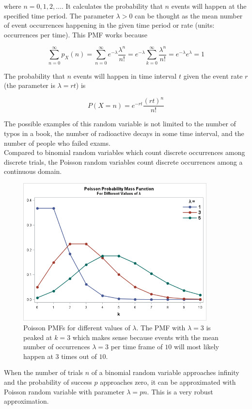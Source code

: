 where $n=0,1,2,\dots$. It calculates the probability that $n$ events will happen at the specified time period. The parameter $\lambda>0$ can be thought as the mean number of event occurrences happening in the given time period or rate (units: occurrences per time). This PMF works because

$$\sum_{n=0}^\infty p_X(n) = \sum_{n=0}^\infty e^{-\lambda}\frac{\lambda^n}{n!} = e^{-\lambda} \sum_{k=0}^\infty \frac{\lambda^n}{n!}=e^{-\lambda}e^\lambda=1$$

The probability that $n$ events will happen in time interval $t$ given the event rate $r$ (the parameter is $\lambda=rt$) is

$$P(X=n)=e^{-rt}\frac{(rt)^n}{n!}$$

The possible examples of this random variable is not limited to the number of typos in a book, the number of radioactive decays in some time interval, and the number of people who failed exams. \\

Compared to binomial random variables which count discrete occurrences among discrete trials, the Poisson random variables count discrete occurrences among a continuous domain.

\begin{figure}[H]
	\centering
	\includegraphics[width=100mm]{11.png}
	\caption{Poisson PMFs for different values of $\lambda$. The PMF with $\lambda=3$ is peaked at $k=3$ which makes sense because events with the mean number of occurrences $\lambda=3$ per time frame of $10$ will most likely happen at $3$ times out of $10$.}
\end{figure}

When the number of trials $n$ of a binomial random variable approaches infinity and the probability of success $p$ approaches zero, it can be approximated with Poisson random variable with parameter $\lambda=pn$. This is a very robust approximation. \\


